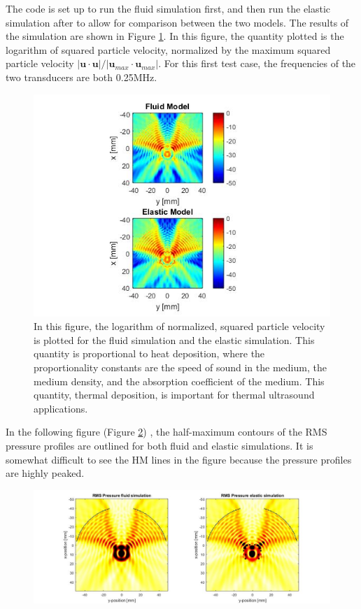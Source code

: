\documentclass[10pt,a4paper]{article}
\begin{document}
The code is set up to run the fluid simulation first, and then run the elastic simulation after to allow for comparison between the two models. The results of the simulation are shown in Figure \ref{elasticvsfluid_heatmap}. In this figure, the quantity plotted is the logarithm of squared particle velocity, normalized by the maximum squared particle velocity $\vert \textbf{u} \cdot \textbf{u} \vert / \vert  \textbf{u}_{max} \cdot \textbf{u}_{max}\vert $. For this first test case, the frequencies of the two transducers are both 0.25MHz. 

\begin{figure}[H]\label{elasticvsfluid_heatmap}
\centering
\includegraphics[scale=0.7]{circle_elasticvsfluid_heatmap}
\caption{In this figure, the logarithm of normalized, squared particle velocity is plotted for the fluid simulation and the elastic simulation. This quantity is proportional to heat deposition, where the proportionality constants are the speed of sound in the medium, the medium density, and the absorption coefficient of the medium. This quantity, thermal deposition, is important for thermal ultrasound applications.}
\end{figure}

In the following figure (Figure \ref{HM_elasticvsfluid}) , the half-maximum contours of the RMS pressure profiles are outlined for both fluid and elastic simulations. It is somewhat difficult to see the HM lines in the figure because the pressure profiles are highly peaked. 

\begin{figure}[H]\label{HM_elasticvsfluid}
\hspace*{-4cm}                                                    
\includegraphics[scale=0.5]{FWHM_elasticvsfluid}
\end{figure}
\end{document}
